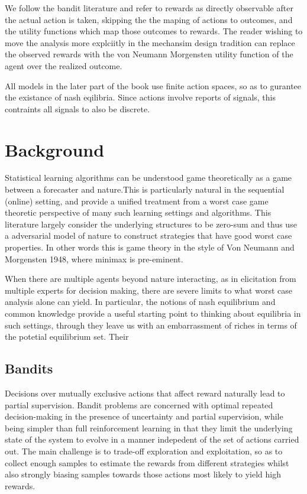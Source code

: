 We follow the bandit literature and refer to rewards as directly observable after the actual action is taken, skipping the the maping of actions to outcomes, and the utility functions which map those outcomes to rewards. The reader wishing to move the analysis more explciitly in the mechansim design tradition can replace the observed rewards with the von Neumann Morgensten utility function of the agent over the realized outcome.

All models in the later part of the book use finite action spaces, so as to gurantee the existance of nash eqilibria. Since actions involve reports of signals, this contraints all signals to also be discrete. 



\section{Background}


Statistical learning algorithms can be understood game theoretically as a game between a forecaster and nature.This is particularly natural in the sequential (online) setting, and \cite{cesa2006prediction} provide a unified treatment from a worst case game theoretic perspective of many such learning settings and algorithms.
This literature largely consider the underlying structures to be zero-sum and thus use a adversarial model of nature to construct strategies that have good worst case properties. In other words this is game theory in the style of Von Neumann and Morgensten 1948, where minimax is pre-eminent. 

When there are multiple agents beyond nature interacting, as in elicitation from multiple experts for decision making, there are severe limits to what worst case analysis alone can yield. In particular, the notions of nash equilibrium \cite{nash1950equilibrium} and common knowledge \cite{aumann1976agreeing} provide a useful starting point to thinking about equilibria in such settings, through they leave us with an embarrassment of riches in terms of the potetial equilibrium set. Their 


\subsection{Bandits}

Decisions over mutually exclusive actions that affect reward naturally lead to partial supervision.
Bandit problems are concerned with optimal repeated decision-making in the presence of uncertainty and partial supervision, while being simpler than full reinforcement learning in that they limit the underlying state of the system to evolve in a manner indepedent of the set of actions carried out. 
The main challenge is to trade-off exploration and exploitation, so as to collect enough samples to estimate the rewards from different strategies whilst also strongly biasing samples towards those actions most likely to yield high rewards.  

